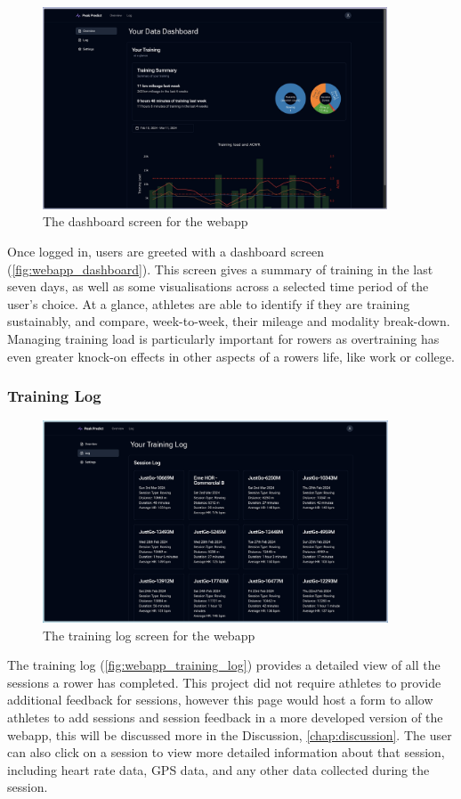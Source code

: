 \begin{figure}[htbp]
  \centering
  \includegraphics[height=6cm]{figures/fyp_dash_overview.jpeg}
  \captionsetup{justification=centering}
  \caption[Webapp Dashboard]{The dashboard screen for the webapp} \label{fig:webapp_dashboard}
\end{figure}

Once logged in, users are greeted with a dashboard screen (\autoref{fig:webapp_dashboard}). This screen gives a summary of training in the last seven days, as well as some visualisations across a selected time period of the user's choice. At a glance, athletes are able to identify if they are training sustainably, and compare, week-to-week, their mileage and modality break-down. Managing training load is particularly important for rowers as overtraining has even greater knock-on effects in other aspects of a rowers life, like work or college.

\subsubsection{Training Log}

\begin{figure}[htbp]
  \centering
  \includegraphics[height=6cm]{figures/fyp_training_log.jpeg}
  \captionsetup{justification=centering}
  \caption[Webapp Training Log]{The training log screen for the webapp} \label{fig:webapp_training_log}
\end{figure}
The training log (\autoref{fig:webapp_training_log}) provides a detailed view of all the sessions a rower has completed. This project did not require athletes to provide additional feedback for sessions, however this page would host a form to allow athletes to add sessions and session feedback in a more developed version of the webapp, this will be discussed more in the Discussion, \autoref{chap:discussion}. The user can also click on a session to view more detailed information about that session, including heart rate data, GPS data, and any other data collected during the session. 

